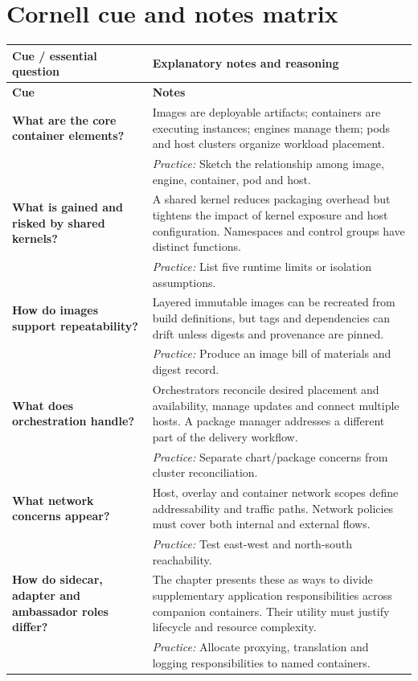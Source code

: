 \documentclass[10pt,letterpaper]{article}
\begin{document}
\section{Cornell cue and notes matrix}
\small\setlength{\LTleft}{0pt}\setlength{\LTright}{0pt plus 1fill}
\begin{longtable}{>{\RaggedRight\arraybackslash}p{}>{\RaggedRight\arraybackslash}p{}}
\toprule\textbf{Cue / essential question}&\textbf{Explanatory notes and reasoning}\\\midrule\endfirsthead\toprule\textbf{Cue}&\textbf{Notes}\\\midrule\endhead
\textbf{What are the core container elements?} & Images are deployable artifacts; containers are executing instances; engines manage them; pods and host clusters organize workload placement.\\[3pt]& \textcolor{petrol}{\emph{Practice:} Sketch the relationship among image, engine, container, pod and host.}\\[8pt]\midrule
\textbf{What is gained and risked by shared kernels?} & A shared kernel reduces packaging overhead but tightens the impact of kernel exposure and host configuration. Namespaces and control groups have distinct functions.\\[3pt]& \textcolor{petrol}{\emph{Practice:} List five runtime limits or isolation assumptions.}\\[8pt]\midrule
\textbf{How do images support repeatability?} & Layered immutable images can be recreated from build definitions, but tags and dependencies can drift unless digests and provenance are pinned.\\[3pt]& \textcolor{petrol}{\emph{Practice:} Produce an image bill of materials and digest record.}\\[8pt]\midrule
\textbf{What does orchestration handle?} & Orchestrators reconcile desired placement and availability, manage updates and connect multiple hosts. A package manager addresses a different part of the delivery workflow.\\[3pt]& \textcolor{petrol}{\emph{Practice:} Separate chart/package concerns from cluster reconciliation.}\\[8pt]\midrule
\textbf{What network concerns appear?} & Host, overlay and container network scopes define addressability and traffic paths. Network policies must cover both internal and external flows.\\[3pt]& \textcolor{petrol}{\emph{Practice:} Test east-west and north-south reachability.}\\[8pt]\midrule
\textbf{How do sidecar, adapter and ambassador roles differ?} & The chapter presents these as ways to divide supplementary application responsibilities across companion containers. Their utility must justify lifecycle and resource complexity.\\[3pt]& \textcolor{petrol}{\emph{Practice:} Allocate proxying, translation and logging responsibilities to named containers.}\\[8pt]\midrule
\end{longtable}\normalsize
\end{document}
